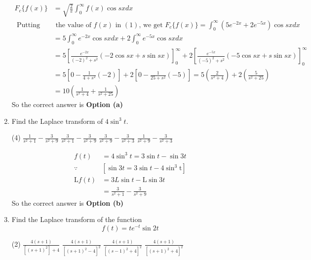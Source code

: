 \begin{enumerate}
\begin{answer}
$$\begin{aligned}
	F_{c}\{f(x)\}&=\sqrt{\frac{2}{\pi}} \int_{0}^{\infty} f(x) \cos s x d x\\
	\text { Putting} &\text{ the value of }f(x) \text { in }(1) \text {, we get } F_{c}\{f(x)\}=\int_{0}^{\infty}\left(5 e^{-2 x}+2 e^{-5 x}\right) \cos s x d x\\
	&=5 \int_{0}^{\infty} e^{-2 x} \cos s x d x+2 \int_{0}^{\infty} e^{-5 x} \cos s x d x \\
	&=5\left[\frac{e^{-2 x}}{(-2)^{2}+s^{2}}(-2 \cos s x+s \sin s x)\right]_{0}^{\infty}+2\left[\frac{e^{-5 x}}{(-5)^{2}+s^{2}}(-5 \cos s x+s \sin s x)\right]_{0}^{\infty}\\
	&=5\left[0-\frac{1}{4+s^{2}}(-2)\right]+2\left[0-\frac{1}{25+s^{2}}(-5)\right]=5\left(\frac{2}{s^{2}+4}\right)+2\left(\frac{5}{s^{2}+25}\right) \\
	&=10\left(\frac{1}{s^{2}+4}+\frac{1}{s^{2}+25}\right)
\end{aligned}
$$
	So the correct answer is \textbf{Option (a)}
\end{answer}
\item Find the Laplace transform of $4 \sin ^{3} t$.
\begin{tasks}(4)
	\task[\textbf{a.}]$\frac{1}{s^{2}+1}-\frac{3}{s^{2}+9}$
	\task[\textbf{b.}]$\frac{3}{s^{2}+1}-\frac{3}{s^{2}+9}$
	\task[\textbf{c.}]$\frac{3}{s^{2}+9}-\frac{3}{s^{2}+3}$
	\task[\textbf{d.}] $\frac{1}{s^{2}+9}-\frac{3}{s^{2}+3}$
\end{tasks}
\begin{answer}
	$$\begin{aligned}
	f(t)&=4 \sin ^{3} t=3 \sin t-\sin 3 t\\
	\because &\left[\sin 3 t=3 \sin t-4 \sin ^{3} \mathrm{t}\right]\\
	\mathrm{L} f(t)&=3 L \sin t-\mathrm{L} \sin 3 t\\&=\frac{3}{s^{2}+1}-\frac{3}{s^{2}+9}
\end{aligned}$$
	So the correct answer is \textbf{Option (b)}
\end{answer}
\item Find the Laplace transform of the function
$$
f(t)=t e^{-t} \sin 2 t
$$
\begin{tasks}(2)
	\task[\textbf{a.}]$\frac{4(s+1)}{\left[(s+1)^{2}\right]+4}$
	\task[\textbf{b.}]$\frac{4(s+1)}{\left[(s+1)^{2}-4\right]^{2}}$
	\task[\textbf{c.}]$\frac{4(s+1)}{\left[(s-1)^{2}+4\right]^{2}}$
	\task[\textbf{d.}] $\frac{4(s+1)}{\left[(s+1)^{2}+4\right]^{2}}$
\end{tasks}
\begin{answer}

\end{answer}
\end{enumerate}
